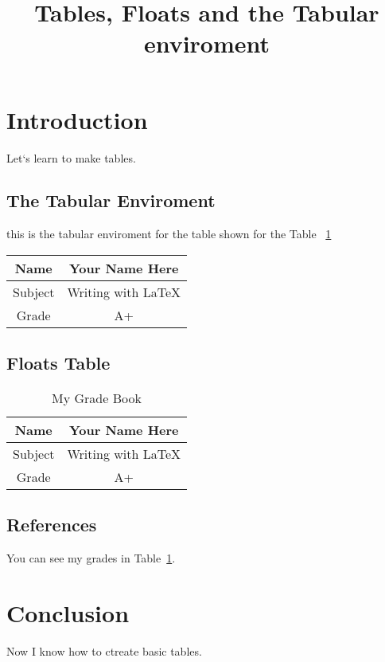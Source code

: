 \documentclass{article}
\title{Tables, Floats and the Tabular enviroment}
\date{}
\begin{document}
\maketitle

\section{Introduction}

Let`s learn to make tables.

\subsection{The Tabular Enviroment}

this is the tabular enviroment for the table shown for the Table ~\ref{tab:grades}
\vspace{.5cm}

\begin{tabular}{|c||c|} %
	\hline
	Name & Your Name Here \\
	\hline
	Subject & Writing with \LaTeX \\
	\hline
	Grade & A+ \\
	\hline
\end{tabular}
\subsection{Floats Table}

\begin{table}[htbp]
	\caption{My Grade Book}
	\begin{center}
		\begin{tabular}{|c||c|} %
			\hline
			Name & Your Name Here \\
			\hline
			Subject & Writing with \LaTeX \\
			\hline
			Grade & A+ \\
			\hline
		\end{tabular}
	\end{center}
	\label{tab:grades}
\end{table}

\subsection{References}

You can see my grades in Table~\ref{tab:grades}.

\section{Conclusion}

Now I know how to ctreate basic tables.
\end{document}
